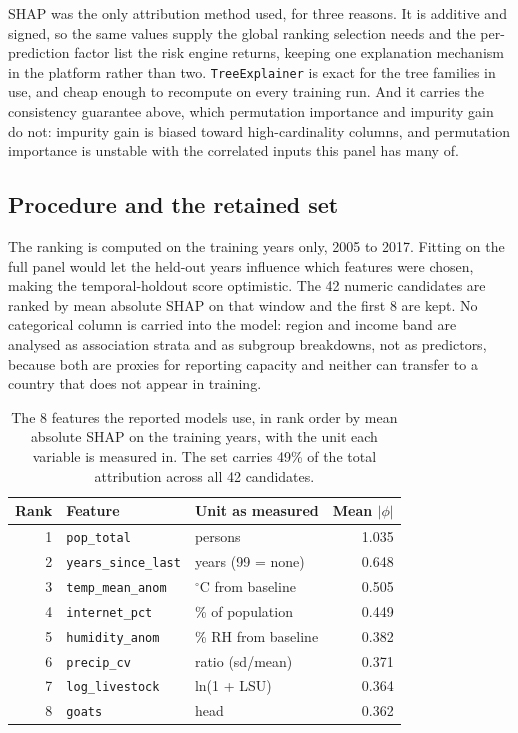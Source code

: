 \documentclass[10pt,openany]{report}
\begin{document}
SHAP was the only attribution method used, for three reasons. It is additive and signed, so the same
values supply the global ranking selection needs and the per-prediction factor list the risk engine
returns, keeping one explanation mechanism in the platform rather than two. \texttt{TreeExplainer} is
exact for the tree families in use, and cheap enough to recompute on every training run. And it
carries the consistency guarantee above, which permutation importance and impurity gain do not:
impurity gain is biased toward high-cardinality columns, and permutation importance is unstable with
the correlated inputs this panel has many of.

\subsection*{Procedure and the retained set}

The ranking is computed on the training years only, 2005 to 2017. Fitting on the full panel
would let the held-out years influence which features were chosen, making the temporal-holdout score
optimistic. The 42 numeric candidates are ranked by mean absolute SHAP on that window and the
first 8 are kept. No categorical column is carried into the model: region and income band are
analysed as association strata and as subgroup breakdowns, not as predictors, because both are proxies
for reporting capacity and neither can transfer to a country that does not appear in training.

\begin{table}[htbp]
\centering
\caption{The 8 features the reported models use, in rank order by mean absolute SHAP on the
training years, with the unit each variable is measured in. The set carries 49\% of the total
attribution across all 42 candidates.}
\label{tab:selected}
\small
\begin{tabular}{@{}rlp{4.6cm}r@{}}
\toprule
\textbf{Rank} & \textbf{Feature} & \textbf{Unit as measured} & \textbf{Mean $|\phi|$} \\
\midrule
1 & \texttt{pop\_total} & persons & 1.035 \\
2 & \texttt{years\_since\_last} & years (99 = none) & 0.648 \\
3 & \texttt{temp\_mean\_anom} & $^\circ$C from baseline & 0.505 \\
4 & \texttt{internet\_pct} & \% of population & 0.449 \\
5 & \texttt{humidity\_anom} & \% RH from baseline & 0.382 \\
6 & \texttt{precip\_cv} & ratio (sd/mean) & 0.371 \\
7 & \texttt{log\_livestock} & ln(1 + LSU) & 0.364 \\
8 & \texttt{goats} & head & 0.362 \\
\bottomrule
\end{tabular}
\end{table}
\end{document}
